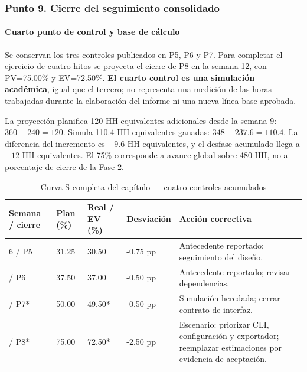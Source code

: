 \subsubsection{Punto 9. Cierre del seguimiento consolidado}
\paragraph*{Cuarto punto de control y base de cálculo}
Se conservan los tres controles publicados en P5, P6 y P7. Para completar el ejercicio de cuatro hitos se proyecta el cierre de P8 en la semana 12, con PV=75.00\% y EV=72.50\%. \textbf{El cuarto control es una simulación académica}, igual que el tercero; no representa una medición de las horas trabajadas durante la elaboración del informe ni una nueva línea base aprobada.

La proyección planifica 120 HH equivalentes adicionales desde la semana 9: $360-240=120$. Simula 110.4 HH equivalentes ganadas: $348-237.6=110.4$. La diferencia del incremento es $-9.6$ HH equivalentes, y el desfase acumulado llega a $-12$ HH equivalentes. El 75\% corresponde a avance global sobre 480 HH, no a porcentaje de cierre de la Fase 2.

\begin{table}[H]
\centering\small{}
\caption{Curva S completa del capítulo --- cuatro controles acumulados}
\begin{tabularx}{\textwidth}{P{2cm}P{1.8cm}P{1.8cm}P{2.15cm}Y}
\toprule
\textbf{Semana / cierre} & \textbf{Plan (\%)} & \textbf{Real / EV (\%)} & \textbf{Desviación} & \textbf{Acción correctiva} \\
 / P5 & 31.25 & 30.50 & -0.75 pp & Antecedente reportado; seguimiento del diseño. \\
 / P6 & 37.50 & 37.00 & -0.50 pp & Antecedente reportado; revisar dependencias. \\
 / P7* & 50.00 & 49.50* & -0.50 pp & Simulación heredada; cerrar contrato de interfaz. \\
 / P8* & 75.00 & 72.50* & -2.50 pp & Escenario: priorizar CLI, configuración y exportador; reemplazar estimaciones por evidencia de aceptación. \\
\bottomrule
\end{tabularx}
\end{table}

